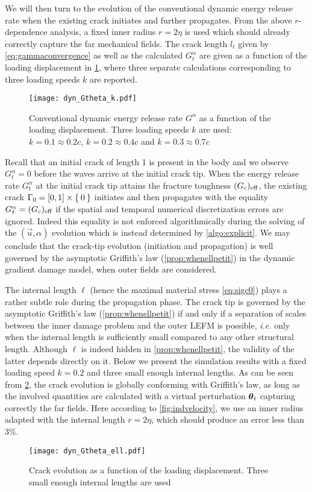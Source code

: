 We will then turn to the evolution of the conventional dynamic energy release rate when the existing crack initiates and further propagates. From the above $r$-dependence analysis, a fixed inner radius $r=2\eta$ is used which should already correctly capture the far mechanical fields. The crack length $l_t$ given by \eqref{eq:gammaconvergence} as well as the calculated $G^\alpha_t$ are given as a function of the loading displacement in \cref{fig:evoGtGc}, where three separate calculations corresponding to three loading speeds $k$ are reported.
\begin{figure}[htbp]
\centering
\texttt{[image: dyn\_Gtheta\_k.pdf]}
\caption{Conventional dynamic energy release rate $G^\alpha$ as a function of the loading displacement. Three loading speeds $k$ are used: $k=0.1\approx 0.2c$, $k=0.2\approx 0.4c$ and $k=0.3\approx 0.7c$} \label{fig:evoGtGc}
\end{figure}
Recall that an initial crack of length 1 is present in the body and we observe $G^\alpha_t=0$ before the waves arrive at the initial crack tip. When the energy release rate $G^\alpha_t$ at the initial crack tip attains the fracture toughness $(G_\mathrm{c})_\mathrm{eff}$, the existing crack $\Gamma_0=[0,1]\times\Set{0}$ initiates and then propagates with the equality $G^\alpha_t=(G_\mathrm{c})_\mathrm{eff}$ if the spatial and temporal numerical discretization errors are ignored. Indeed this equality is not enforced algorithmically during the solving of the $(\vec{u},\alpha)$ evolution which is instead determined by \cref{algo:explicit}. We may conclude that the crack-tip evolution (initiation and propagation) is well governed by the asymptotic Griffith's law (\cref{prop:whenellpetit}) in the dynamic gradient damage model, when outer fields are considered.

The internal length $\ell$ (hence the maximal material stress \eqref{eq:sigc0}) plays a rather subtle role during the propagation phase. The crack tip is governed by the asymptotic Griffith's law (\cref{prop:whenellpetit}) if and only if a separation of scales between the inner damage problem and the outer LEFM is possible, \emph{i.e.} only when the internal length is sufficiently small compared to any other structural length. Although $\ell$ is indeed hidden in \cref{prop:whenellpetit}, the validity of the latter depends directly on it. Below we present the simulation results with a fixed loading speed $k=0.2$ and three small enough internal lengths. As can be seen from \cref{fig:evoGtGcell}, the crack evolution is globally conforming with Griffith's law, as long as the involved quantities are calculated with a virtual perturbation $\vtheta_t$ capturing correctly the far fields. Here according to \cref{fig:indvelocity}, we use an inner radius adapted with the internal length $r=2\eta$, which should produce an error less than $3\%$.
\begin{figure}[htbp]
\centering
\texttt{[image: dyn\_Gtheta\_ell.pdf]}
\caption{Crack evolution as a function of the loading displacement. Three small enough internal lengths are used} \label{fig:evoGtGcell}
\end{figure}

